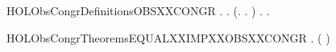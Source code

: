 \newcommand{\HOLObsCongrDate}{13 Giugno 2018}
\newcommand{\HOLObsCongrTime}{00:14}
\begin{SaveVerbatim}{HOLObsCongrDefinitionsOBSXXCONGR}
\HOLTokenTurnstile{} \HOLSymConst{\HOLTokenForall{}} .
          \HOLSymConst{\HOLTokenEquiv{}}
       \HOLSymConst{\HOLTokenForall{}}.
           (\HOLSymConst{\HOLTokenForall{}}.  \HOLTokenTransBegin{}\HOLTokenTransEnd {} \HOLSymConst{\HOLTokenImp{}} \HOLSymConst{\HOLTokenExists{}}.  \HOLTokenWeakTransBegin{}\HOLTokenWeakTransEnd {} \HOLSymConst{\HOLTokenConj{}}   ) \HOLSymConst{\HOLTokenConj{}}
           \HOLSymConst{\HOLTokenForall{}}.  \HOLTokenTransBegin{}\HOLTokenTransEnd {} \HOLSymConst{\HOLTokenImp{}} \HOLSymConst{\HOLTokenExists{}}.  \HOLTokenWeakTransBegin{}\HOLTokenWeakTransEnd {} \HOLSymConst{\HOLTokenConj{}}   
\end{SaveVerbatim}
\newcommand{\HOLObsCongrDefinitionsOBSXXCONGR}{\UseVerbatim{HOLObsCongrDefinitionsOBSXXCONGR}}
\newcommand{\HOLObsCongrDefinitions}{
\HOLDfnTag{ObsCongr}{OBS_CONGR}\HOLObsCongrDefinitionsOBSXXCONGR
}
\begin{SaveVerbatim}{HOLObsCongrTheoremsEQUALXXIMPXXOBSXXCONGR}
\HOLTokenTurnstile{} \HOLSymConst{\HOLTokenForall{}} . ( \HOLSymConst{=} ) \HOLSymConst{\HOLTokenImp{}}   
\end{SaveVerbatim}
\newcommand{\HOLObsCongrTheoremsEQUALXXIMPXXOBSXXCONGR}{\UseVerbatim{HOLObsCongrTheoremsEQUALXXIMPXXOBSXXCONGR}}

